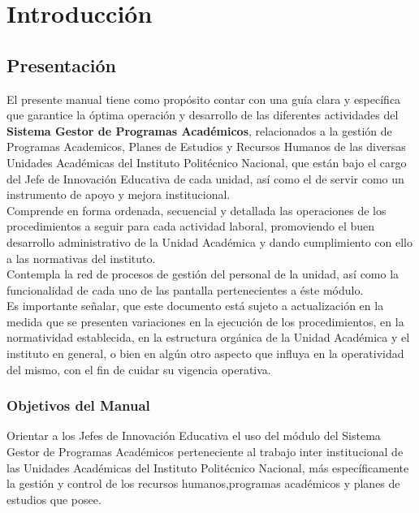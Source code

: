 \chapter{Introducción}
\section{Presentación}
El presente manual tiene como propósito contar con una guía clara y específica que garantice la óptima operación y desarrollo de las diferentes actividades del \textbf{Sistema Gestor de Programas Académicos}, relacionados a la gestión de Programas Academicos, Planes de Estudios y Recursos Humanos de las diversas Unidades Académicas del Instituto Politécnico Nacional, que están bajo el cargo del Jefe de Innovación Educativa de cada unidad, así como el de servir como un instrumento de apoyo y mejora institucional.\\

Comprende en forma ordenada, secuencial y detallada las operaciones de los procedimientos a seguir para cada actividad laboral, promoviendo el buen desarrollo administrativo de la Unidad Académica y dando cumplimiento con ello a las normativas del instituto.\\

Contempla la red de procesos de gestión del personal de la unidad, así como la funcionalidad de cada uno de las pantalla pertenecientes a éste módulo.\\

Es importante señalar, que este documento está sujeto a actualización en la medida que se presenten variaciones en la ejecución de los procedimientos, en la normatividad establecida, en la estructura orgánica de la Unidad Académica y el instituto en general, o bien en algún otro aspecto que influya en la operatividad del mismo, con el fin de cuidar su vigencia operativa.\\

    \subsection{Objetivos del Manual}
     Orientar a los Jefes de Innovación Educativa el uso del módulo del Sistema Gestor de Programas Académicos perteneciente al trabajo inter institucional de las Unidades Académicas del Instituto Politécnico Nacional, más específicamente la gestión y control de los recursos humanos,programas académicos y planes de estudios que posee.

